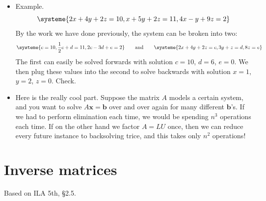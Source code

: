 \documentclass[11pt,oneside]{amsbook}
\theoremstyle{definition}
\theoremstyle{plain}
\theoremstyle{definition}
\theoremstyle{remark}
\numberwithin{equation}{section}
\numberwithin{figure}{section}
\begin{document}
\begin{itemize}
\item Example.
  \[\systeme{2x+4y+2z=10,x+5y+2z=11,4x-y+9z=2}
  \]
  By the work we have done previously, the system can be broken into two:
  \[\systeme{c=10,\frac12c+d=11,2c-3d+e=2}
    \qquad\text{and}\qquad
    \systeme{2x+4y+2z=c,3y+z=d,8z=e}
  \]
  The first can easily be solved forwards with solution $c=10$, $d=6$, $e=0$. We then plug these values into the second to solve backwards with solution $x=1$, $y=2$, $z=0$. Check.
\item Here is the really cool part. Suppose the matrix $A$ models a certain system, and you want to solve $A\mathbf{x}=\mathbf{b}$ over and over again for many different $\mathbf{b}$'s. If we had to perform elimination each time, we would be spending $n^3$ operations each time. If on the other hand we factor $A=LU$ once, then we can reduce every future instance to backsolving trice, and this takes only $n^2$ operations!
\end{itemize}

\newpage
\section{Inverse matrices}

Based on ILA 5th, \S 2.5.
\end{document}
